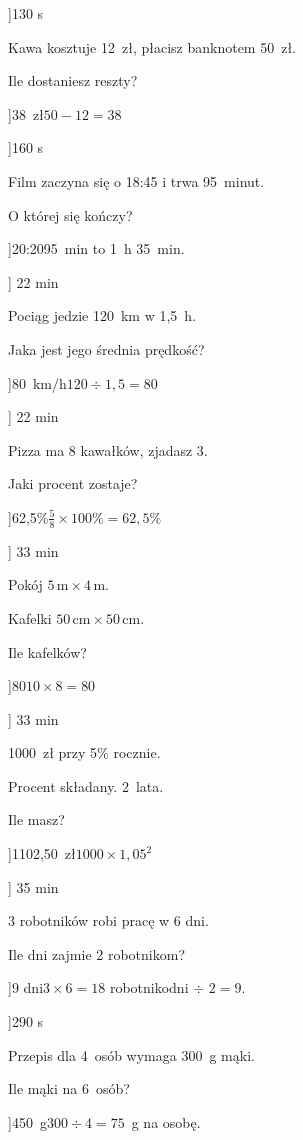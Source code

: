 
\ExerciseSlide[\CategoryBadge[MixColor!20]{Zakupy}]{1}{30 s}{%
    Kawa kosztuje 12~z\l{}, p\l{}acisz banknotem 50~z\l{}.\par
    Ile dostaniesz reszty?
  }
\AnswerSlide[\CategoryBadge[MixColor!20]{Zakupy}]{38~z\l{}}{$50 - 12 = 38$}

\ExerciseSlide[\CategoryBadge[MixColor!20]{Czas}]{1}{60 s}{%
    Film zaczyna si\k{e} o 18:45 i trwa 95~minut.\par
    O kt\'{o}rej si\k{e} ko\'nczy?
  }
\AnswerSlide[\CategoryBadge[MixColor!20]{Czas}]{20:20}{95~min to 1~h 35~min.}

\ExerciseSlide[\CategoryBadge[MixColor!20]{Pr\k{e}dko\'s\'c}]
  {2}{2 min}{%
    Poci\k{a}g jedzie 120~km w 1{,}5~h.\par
    Jaka jest jego \'{s}rednia pr\k{e}dko\'s\'c?
  }
\AnswerSlide[\CategoryBadge[MixColor!20]{Pr\k{e}dko\'s\'c}]{80~km/h}{$120 \div 1{,}5 = 80$}

\ExerciseSlide[\CategoryBadge[MixColor!20]{Procenty}]
  {2}{2 min}{%
    Pizza ma 8 kawa\l{}k\'{o}w, zjadasz 3.\par
    Jaki procent zostaje?
  }
\AnswerSlide[\CategoryBadge[MixColor!20]{Procenty}]{62{,}5\%}{$\tfrac{5}{8} \times 100\% = 62{,}5\%$}

\ExerciseSlide[\CategoryBadge[MixColor!20]{Geometria}]
  {3}{3 min}{%
    Pok\'{o}j $5\,\text{m}\times 4\,\text{m}$.\par
    Kafelki $50\,\text{cm}\times 50\,\text{cm}$.\par
    Ile kafelk\'{o}w?
  }
\AnswerSlide[\CategoryBadge[MixColor!20]{Geometria}]{80}{$10 \times 8 = 80$}

\ExerciseSlide[\CategoryBadge[MixColor!20]{Finanse}]
  {3}{3 min}{%
    1000~z\l{} przy 5\% rocznie.\par
    Procent sk\l{}adany. 2~lata.\par
    Ile masz?
  }
\AnswerSlide[\CategoryBadge[MixColor!20]{Finanse}]{1102{,}50~z\l{}}{$1000 \times 1{,}05^2$}

\ExerciseSlide[\CategoryBadge[MixColor!20]{Praca}]
  {3}{5 min}{%
    3 robotnik\'{o}w robi prac\k{e} w 6 dni.\par
    Ile dni zajmie 2 robotnikom?
  }
\AnswerSlide[\CategoryBadge[MixColor!20]{Praca}]{9 dni}{$3 \times 6 = 18$ robotnikodni $\div$ $2 = 9$.}

\ExerciseSlide[\CategoryBadge[MixColor!20]{Proporcje}]{2}{90 s}{%
    Przepis dla 4~os\'{o}b wymaga 300~g m\k{a}ki.\par
    Ile m\k{a}ki na 6~os\'{o}b?
  }
\AnswerSlide[\CategoryBadge[MixColor!20]{Proporcje}]{450~g}{$300 \div 4 = 75$~g na osob\k{e}.}
